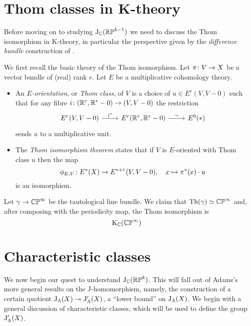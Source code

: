 
\section{Thom classes in K-theory}

Before moving on to studying $\mathrm{J}_{\mathbb{C}}(\mathbb{RP}^{k-1})$ we need to discuss the
Thom isomorphism in K-theory, in particular the perspective given by
the \emph{difference bundle} construction of \cite{abs-clifford}.

\begin{nothing}
  \label{thom-iso}
  We first recall the basic theory of the Thom isomorphism. Let $\pi
  \colon V \to X$ be a vector bundle of (real) rank $r$. Let $E$ be a
  multiplicative cohomology theory.
  \begin{itemize}[leftmargin=*]
  \item An \emph{$E$-orientation}, or \emph{Thom class}, of $V$ is a
    choice of $u \in E^r(V,V-0)$ such that for any fibre $i \colon
    (\mathbb{R}^r,\mathbb{R}^r-0) \to (V,V-0)$ the restriction
    \[
    \begin{tikzcd}
      E^r(V,V-0) \rar{i^*} & E^r(\R^r, \R^r-0) \rar{\sim} & E^0(*)
    \end{tikzcd}
    \]
    sends $u$ to a multiplicative unit.
  \item The \emph{Thom isomorphism theorem} states that if $V$ is
    $E$-oriented with Thom class $u$ then the map
    \[
    \phi_{E,V} \colon E^*(X) \to E^{*+r}(V,V-0), \quad x \mapsto \pi^*(x)
    \cdot u
    \]
    is an isomorphism.
  \end{itemize}
\end{nothing}

\begin{example}
  \label{taut-thom}
  Let $\gamma \to \mathbb{CP}^\infty$ be the tautological line bundle. We
  claim that $\operatorname{Th}(\gamma) \simeq \mathbb{CP}^\infty$ and, after composing with
  the periodicity map, the Thom isomorphism is 
  \[
  \mathrm{K}_{\mathbb{C}}(\mathbb{CP}^\infty) 
  \]
\end{example}


\section{Characteristic classes}

We now begin our quest to understand $\mathrm{J}_{\mathbb{C}}(\mathbb{RP}^k)$. This will fall
out of Adams's more general results on the J-homomorphism, namely, the
construction of a certain quotient $\mathrm{J}_\Lambda(X) \twoheadrightarrow
\mathrm{J}'_\Lambda(X)$, a ``lower bound'' on $\mathrm{J}_\Lambda(X)$. We begin with a
general discussion of characteristic classes, which will be used to
define the group $\mathrm{J}'_\Lambda(X)$.

